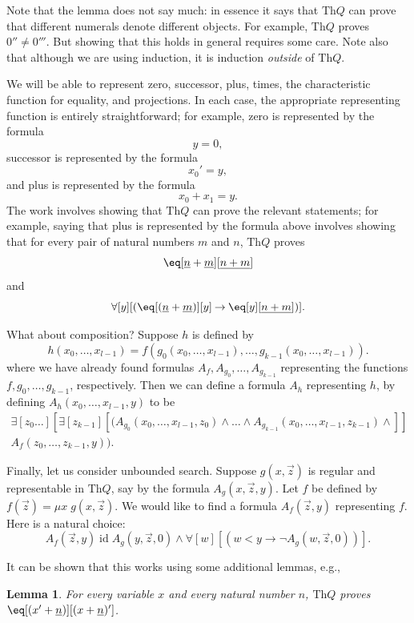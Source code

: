\documentclass[10pt,a4paper]{article}
\theoremstyle{plain}
\newtheorem{lem}[thm]{Lemma}
\theoremstyle{definition}
\theoremstyle{remark}
\providecommand{\lif}{\mathbin{\rightarrow}}
\providecommand{\lforall}{\mathord{\forall}}
\providecommand{\lexists}{\mathord{\exists}}
\providecommand{\Th}{\ensuremath{\mathrm{Th}}}
\providecommand{\num}[1]{\underline{#1}}
\providecommand{\ident}{\operatorname{id}}
\begin{document}
Note that the lemma does not say much: in essence it says that $\Th{Q}$ can
prove that different numerals denote different objects. For example,
$\Th{Q}$ proves $0'' \neq 0'''$. But showing that this holds in general
requires some care. Note also that although we are using induction, it
is induction \emph{outside} of $\Th{Q}$.

We will be able to represent zero, successor, plus, times, the
characteristic function for equality, and projections. In each case,
the appropriate representing function is entirely straightforward; for
example, zero is represented by the formula
\[
y = 0,
\]
successor is represented by the formula
\[
x_0' = y,
\]
and plus is represented by the formula
\[
x_0 + x_1 = y.
\]
The work involves showing that $\Th{Q}$ can prove the relevant statements;
for example, saying that plus is represented by the formula above
involves showing that for every pair of natural numbers $m$ and $n$,
$\Th{Q}$ proves
\[
\eq[\num n + \num m][\num {n+m}]
\]
and
\[
\lforall[y][(\eq[(\num n + \num m)][y] \lif \eq[y][\num {n+m}])].
\]

What about composition? Suppose $h$ is defined by
\[
h(x_0,\dots,x_{l-1}) = f(g_0(x_0,\dots,x_{l-1}), \dots,
g_{k-1}(x_0,\dots,x_{l-1})).
\]
where we have already found formulas $A_f, A_{g_0}, \dots,
A_{g_{k-1}}$ representing the functions $f,g_0,\dots,g_{k-1}$,
respectively. Then we can define a formula $A_h$ representing $h$,
by defining $A_h(x_0,\dots,x_{l-1},y)$ to be
\begin{multline*}
  \lexists[z_0\dots][\lexists[z_{k-1}][(A_{g_0}(x_0,\dots,x_{l-1},z_0) \land
  \dots \land A_{g_{k-1}}(x_0,\dots,x_{l-1},z_{k-1}) \land]]\\
  A_f(z_0,\dots,z_{k-1},y)).
\end{multline*}

Finally, let us consider unbounded search. Suppose $g(x,\vec z)$ is
regular and representable in $\Th{Q}$, say by the formula $A_g(x,\vec
z,y)$. Let $f$ be defined by $f(\vec z) = \mu x \; g(x,\vec z)$. We would
like to find a formula $A_f(\vec z,y)$ representing $f$. Here is
a natural choice:
\[
A_f(\vec z,y) \ident A_g(y,\vec z,0) \land \lforall[w][(w < y
\lif \lnot A_g(w,\vec z,0))].
\]

It can be shown that this works using some additional lemmas, e.g.,

\begin{lem}
  For every variable $x$ and every natural number $n$, $\Th{Q}$ proves $\eq[(x'
  + \num n)][(x + \num n)']$.
\end{lem}
\end{document}
